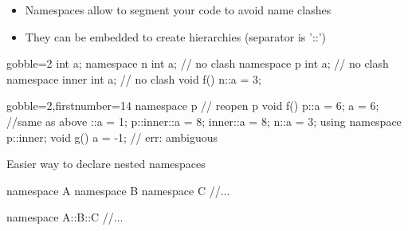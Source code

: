 \begin{frame}[fragile]
  \begin{itemize}
  \item Namespaces allow to segment your code to avoid name clashes
  \item They can be embedded to create hierarchies (separator is '::')
  \end{itemize}
  \begin{multicols}{2}
    \begin{cppcode*}{gobble=2}
      int a;
      namespace n {
        int a;   // no clash
      }
      namespace p {
        int a;   // no clash
        namespace inner {
          int a; // no clash
        }
      }
      void f() {
        n::a = 3;
      }
    \end{cppcode*}
    \columnbreak
    \begin{cppcode*}{gobble=2,firstnumber=14}
      namespace p { // reopen p
        void f() {
          p::a = 6;
          a = 6;  //same as above
          ::a = 1;
          p::inner::a = 8;
          inner::a = 8;
          n::a = 3;
        }
      }
      using namespace p::inner;
      void g() {
        a = -1; // err: ambiguous
      }
  \end{cppcode*}
  \end{multicols}
\end{frame}

\begin{frame}[fragile]
  Easier way to declare nested namespaces
  \begin{alertblock}{}
    \begin{cppcode*}{}
      namespace A {
        namespace B {
          namespace C {
            //...
          }
        }
      }
    \end{cppcode*}
  \end{alertblock}
  \begin{exampleblock}{}
    \begin{cppcode*}{}
      namespace A::B::C {
        //...
      }
    \end{cppcode*}
  \end{exampleblock}
\end{frame}

